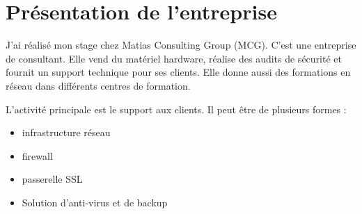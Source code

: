 \section{Présentation de l'entreprise}
J'ai réalisé mon stage chez Matias Consulting Group (MCG).
C'est une entreprise de consultant.
Elle vend du matériel hardware, réalise des audits de sécurité et fournit un support technique pour ses clients.
Elle donne aussi des formations en réseau dans différents centres de formation.

L'activité principale est le support aux clients.
Il peut être de plusieurs formes : 
\begin{itemize}
	\item infrastructure réseau
	\item firewall
	\item passerelle SSL
	\item Solution d'anti-virus et de backup
\end{itemize}